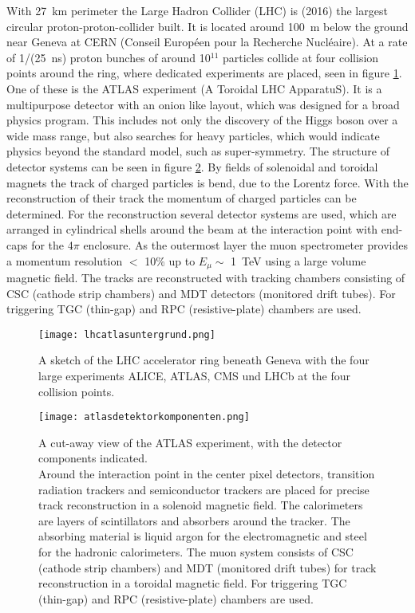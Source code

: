 \documentclass[
a4paper,                                %
twoside,                                %
BCOR1.4cm,                      %
10pt,                           %
headings=normal,                %
headsepline,                    %
clearplainpage, %
final,                                  %
div=14,
parskip=full,
openright,
bibliography=toc
]{scrreprt}
\begin{document}
With \SI{27}{\km} perimeter the Large Hadron Collider (LHC) is (2016) the largest circular proton-proton-collider built. It is located around \SI{100}{\m} below the ground near Geneva at CERN (Conseil Européen pour la Recherche Nucléaire). At a rate of 1/(\SI{25}{\ns}) proton bunches of around 10$^{11}$ particles collide at four collision points around the ring, where dedicated experiments are placed, seen in figure \ref{lhc}. 
One of these is the ATLAS experiment (A Toroidal LHC ApparatuS). It is a multipurpose detector with an onion like layout, which was designed for a broad physics program. This includes not only the discovery of the Higgs boson over a wide mass range, but also searches for heavy particles, which would indicate physics beyond the standard model, such as super-symmetry. The structure of detector systems can be seen in figure \ref{atlas}. By fields of solenoidal and toroidal magnets the track of charged particles is bend, due to the Lorentz force. With the reconstruction of their track the momentum of charged particles can be determined. For the reconstruction several detector systems are used, which are arranged in cylindrical shells around the beam at the interaction point with end-caps for the 4$\pi$ enclosure. As the outermost layer the muon spectrometer provides a momentum resolution $<$ 10\%  up to $E_{\mu} \sim$ \SI{1}{\TeV} using a large volume magnetic field. The tracks are reconstructed with tracking chambers consisting of CSC (cathode strip chambers) and MDT detectors (monitored drift tubes). For triggering TGC (thin-gap) and RPC (resistive-plate) chambers are used. \cite{NSW_TDR}

\begin{figure}[H]
	\centering
	\texttt{[image: lhcatlasuntergrund.png]}
	\caption{A sketch of the LHC accelerator ring beneath Geneva with the four large experiments ALICE, ATLAS, CMS und LHCb at the four collision points. \cite{atlasCol}}
	\label{lhc}
\end{figure}

\begin{figure}[H]
	\texttt{[image: atlasdetektorkomponenten.png]}
	\caption{A cut-away view of the ATLAS experiment, with the detector components indicated. \\ Around the interaction point in the center pixel detectors, transition radiation trackers and semiconductor trackers are placed for precise track reconstruction in a solenoid magnetic field. The calorimeters are layers of scintillators and absorbers around the tracker. The absorbing material is liquid argon for the electromagnetic and steel for the hadronic calorimeters. The muon system consists of CSC (cathode strip chambers) and MDT (monitored drift tubes) for track reconstruction in a toroidal magnetic field. For triggering TGC (thin-gap) and RPC (resistive-plate) chambers are used. \cite{atlasCol}}
	\label{atlas}
\end{figure}
\end{document}
